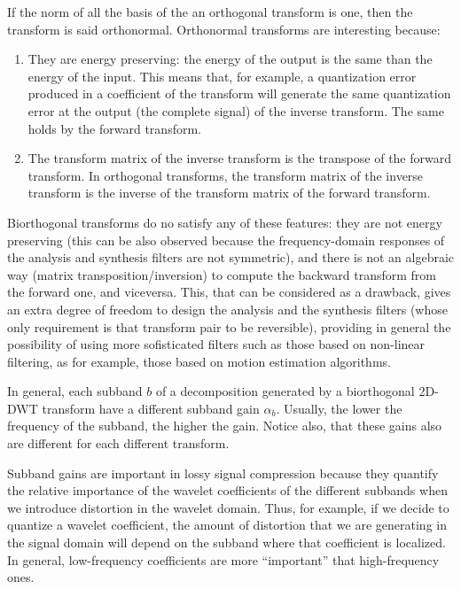 If the norm of all the basis of the an orthogonal transform is one,
then the transform is said orthonormal. Orthonormal transforms are
interesting because:
\begin{enumerate}
\item They are energy preserving: the energy of the output is the same
  than the energy of the input. This means that, for example, a
  quantization error produced in a coefficient of the transform will
  generate the same quantization error at the output (the complete
  signal) of the inverse transform. The same holds by the forward
  transform.
\item The transform matrix of the inverse transform is the transpose
  of the forward transform. In orthogonal transforms, the transform
  matrix of the inverse transform is the inverse of the transform
  matrix of the forward transform.
\end{enumerate}

Biorthogonal transforms do no satisfy any of these features: they are
not energy preserving (this can be also observed because the
frequency-domain responses of the analysis and synthesis filters are
not symmetric), and there is not an algebraic way (matrix
transposition/inversion) to compute the backward transform from the
forward one, and viceversa. This, that can be considered as a
drawback, gives an extra degree of freedom to design the analysis and
the synthesis filters (whose only requirement is that transform pair
to be reversible), providing in general the possibility of using more
sofisticated filters such as those based on non-linear filtering, as
for example, those based on motion estimation algorithms.

In general, each subband $b$ of a decomposition generated by a
biorthogonal 2D-DWT transform have a different subband gain
$\alpha_b$. Usually, the lower the frequency of the subband, the
higher the gain. Notice also, that these gains also are different for
each different transform.

Subband gains are important in lossy signal compression because they
quantify the relative importance of the wavelet coefficients of the
different subbands when we introduce distortion in the wavelet
domain. Thus, for example, if we decide to quantize a wavelet
coefficient, the amount of distortion that we are generating in the
signal domain will depend on the subband where that coefficient is
localized. In general, low-frequency coefficients are more
``important'' that high-frequency ones.

